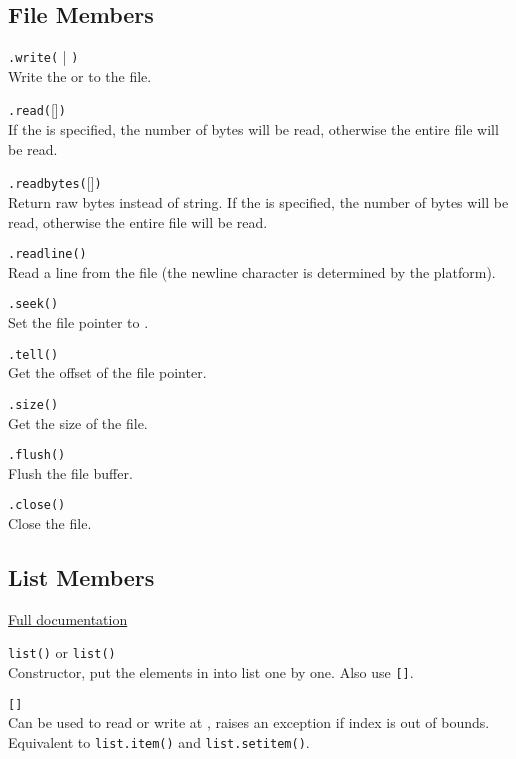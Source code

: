 \subsection*{File Members}

\hangpar {}\texttt{.write(} | \texttt{)}\\
Write the  or  to the file.

\hangpar {}\texttt{.read(}[]\texttt{)}\\
If the  is specified, the number of bytes will be read, otherwise the entire file will be read.

\hangpar {}\texttt{.readbytes(}[]\texttt{)}\\
Return raw bytes instead of string. If the  is specified, the number of bytes will be read, otherwise the entire file will be read.

\hangpar {}\texttt{.readline()}\\
Read a line from the file (the newline character is determined by the platform).

\hangpar {}\texttt{.seek(}\texttt{)}\\
Set the file pointer to .

\hangpar {}\texttt{.tell()}\\
Get the offset of the file pointer.

\hangpar {}\texttt{.size()}\\
Get the size of the file.

\hangpar {}\texttt{.flush()}\\
Flush the file buffer.

\hangpar {}\texttt{.close()}\\
Close the file.

\subsection*{List Members}

\hangpar \href{https://github.com/berry-lang/berry/wiki/Chapter-7\#list-class}{Full documentation}

\hangpar \texttt{list()} or \texttt{list(}\texttt{)}\\
Constructor, put the elements in  into list one by one. Also use \texttt{[]}.

\hangpar  {}\texttt{[}\texttt{]}\\
Can be used to read or write at , raises an exception if index is out of bounds. Equivalent to \texttt{list.item()} and \texttt{list.setitem()}.

